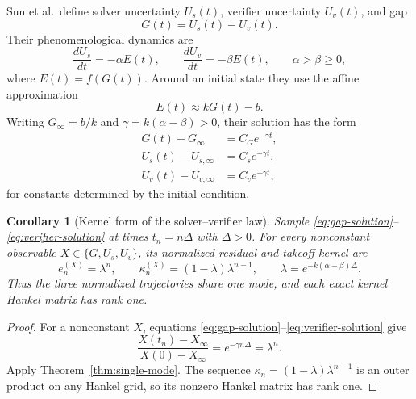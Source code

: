 \documentclass[10pt,twocolumn]{article}
\newtheorem{corollary}{Corollary}
\begin{document}
Sun et al.\ define solver uncertainty $U_s(t)$, verifier uncertainty $U_v(t)$,
and gap
\begin{equation}\label{eq:gap}
 G(t)=U_s(t)-U_v(t).
\end{equation}
Their phenomenological dynamics are
\begin{equation}\label{eq:sun-dynamics}
 \frac{dU_s}{dt}=-\alpha E(t),
 \qquad
 \frac{dU_v}{dt}=-\beta E(t),
 \qquad \alpha>\beta\geq0,
\end{equation}
where $E(t)=f(G(t))$.  Around an initial state they use the affine
approximation
\begin{equation}\label{eq:linear-potential}
 E(t)\approx kG(t)-b.
\end{equation}
Writing $G_\infty=b/k$ and $\gamma=k(\alpha-\beta)>0$, their solution has the
form
\begin{align}
 G(t)-G_\infty&=C_Ge^{-\gamma t},\label{eq:gap-solution}\\
 U_s(t)-U_{s,\infty}&=C_se^{-\gamma t},\label{eq:solver-solution}\\
 U_v(t)-U_{v,\infty}&=C_ve^{-\gamma t},\label{eq:verifier-solution}
\end{align}
for constants determined by the initial condition.

\begin{corollary}[Kernel form of the solver--verifier law]
\label{cor:sun-kernel}
Sample \eqref{eq:gap-solution}--\eqref{eq:verifier-solution} at times
$t_n=n\Delta$ with $\Delta>0$.  For every nonconstant observable
$X\in\{G,U_s,U_v\}$, its normalized residual and takeoff kernel are
\begin{equation}\label{eq:sun-kernel}
 e_n^{(X)}=\lambda^n,
 \qquad
 \kappa_n^{(X)}=(1-\lambda)\lambda^{n-1},
 \qquad
 \lambda=e^{-k(\alpha-\beta)\Delta}.
\end{equation}
Thus the three normalized trajectories share one mode, and each exact kernel
Hankel matrix has rank one.
\end{corollary}

\begin{proof}
For a nonconstant $X$, equations
\eqref{eq:gap-solution}--\eqref{eq:verifier-solution} give
\[
 \frac{X(t_n)-X_\infty}{X(0)-X_\infty}
 =e^{-\gamma n\Delta}=\lambda^n.
\]
Apply Theorem~\ref{thm:single-mode}.  The sequence
$\kappa_n=(1-\lambda)\lambda^{n-1}$ is an outer product on any Hankel grid, so
its nonzero Hankel matrix has rank one.
\end{proof}
\end{document}
